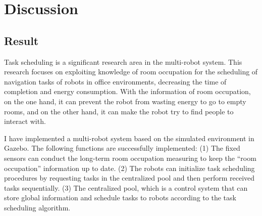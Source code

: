 





\chapter{Discussion}


\section{Result}
\label{sec:conclusion}
Task scheduling is a significant research area in the multi-robot system. This research focuses on exploiting knowledge of room occupation for the scheduling of navigation tasks of robots in office environments,
decreasing the time of completion and energy consumption. With the information of room occupation, on the one hand, it can prevent the robot from wasting energy to go to empty rooms, and on the other hand, it can make the robot try to find people to interact with. 

I have implemented a multi-robot system based on the simulated environment in Gazebo. 
The following functions are successfully implemented:
(1) The fixed sensors can conduct the long-term room occupation measuring to keep the ``room occupation'' information up to date. 
(2) The robots can initialize task scheduling procedures by requesting tasks in the centralized pool and then perform received tasks sequentially.
(3) The centralized pool, which is a control system that can store global information and schedule tasks to robots according to the task scheduling algorithm. 

